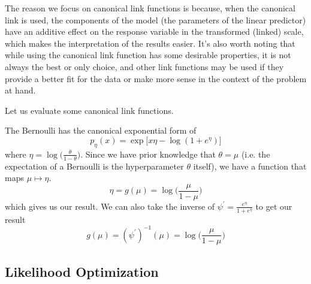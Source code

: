     The reason we focus on canonical link functions is because, when the canonical link is used, the components of the model (the parameters of the linear predictor) have an additive effect on the response variable in the transformed (linked) scale, which makes the interpretation of the results easier. It's also worth noting that while using the canonical link function has some desirable properties, it is not always the best or only choice, and other link functions may be used if they provide a better fit for the data or make more sense in the context of the problem at hand.

    Let us evaluate some canonical link functions. 

    \begin{example}
    The Bernoulli has the canonical exponential form of 
    \[p_\eta (x) = \exp \big[ x \eta - \log (1 + e^\eta) \big]\]
    where $\eta = \log \big( \frac{\theta}{1 - \theta} \big)$. Since we have prior knowledge that $\theta = \mu$ (i.e. the expectation of a Bernoulli is the hyperparameter $\theta$ itself), we have a function that maps $\mu \mapsto \eta$. 
    \[\eta = g(\mu) = \log \bigg( \frac{\mu}{1 - \mu} \bigg)\]
    which gives us our result. We can also take the inverse of $\psi^\prime = \frac{e^\eta}{1 + e^\eta}$ to get our result 
    \[g (\mu) = (\psi^\prime)^{-1} (\mu) = \log \bigg( \frac{\mu}{1 - \mu} \bigg) \]
    \end{example}

\subsection{Likelihood Optimization}

